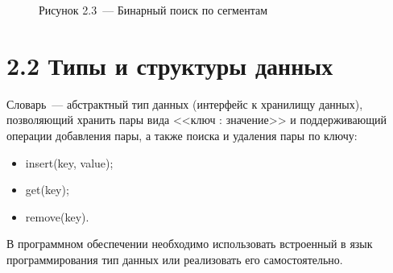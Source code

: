 \documentclass[12pt, a4paper]{report}
\begin{document}
	\begin{figure}[H]
		\caption*{Рисунок 2.3~--- Бинарный поиск по сегментам}
	\end{figure}
	
	\section*{2.2 Типы и структуры данных}
	
	Словарь~--- абстрактный тип данных (интерфейс к хранилищу данных), позволяющий хранить пары вида <<ключ : значение>> и поддерживающий
	операции добавления пары, а также поиска и удаления пары по ключу:
	\begin{itemize}
		\item insert(key, value);
		\item get(key);
		\item remove(key).
	\end{itemize}
	В программном обеспечении необходимо использовать встроенный в язык программирования тип данных или реализовать его самостоятельно.
	
\end{document}
